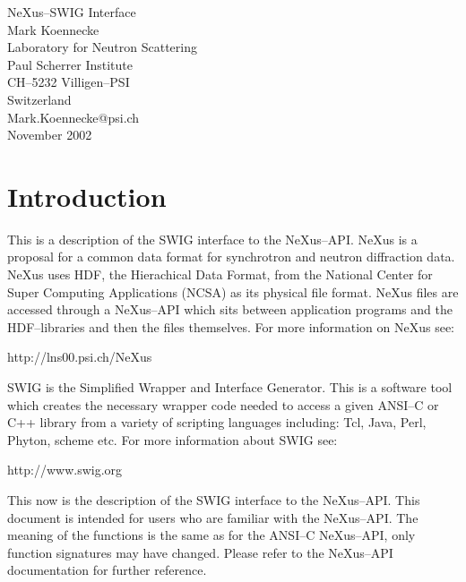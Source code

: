 \documentclass[12pt,a4paper]{article}
\begin{document}
\begin{center}
{\large NeXus--SWIG Interface}\\
Mark Koennecke\\
Laboratory for Neutron Scattering\\
Paul Scherrer Institute\\
CH--5232 Villigen--PSI\\
Switzerland\\
Mark.Koennecke@psi.ch\\
November 2002\\
\end{center}


\section{Introduction}
This is a description of the SWIG interface to the NeXus--API. NeXus
is a proposal for a common data format for synchrotron and neutron
diffraction data. NeXus uses HDF, the Hierachical Data Format, from
the National Center for Super Computing Applications (NCSA) as its
physical file format. NeXus files are accessed through a NeXus--API
which sits between application programs and the HDF--libraries and
then the files themselves. For more information on NeXus see:\\
\centerline{http://lns00.psi.ch/NeXus}

SWIG is the Simplified Wrapper and Interface Generator. This is a
software tool which creates the necessary wrapper code needed to access a
given ANSI--C or C++ library  from a variety of scripting languages
including: Tcl, Java, Perl, Phyton, scheme etc. For more information
about SWIG see:\\
\centerline{http://www.swig.org}

This now is the description of the SWIG interface to the
NeXus--API. This document is intended for users who are familiar with
the NeXus--API. The meaning of the functions is the same as for the
ANSI--C NeXus--API, only function signatures may have changed. Please
refer to the NeXus--API documentation for further reference. 
\end{document}
